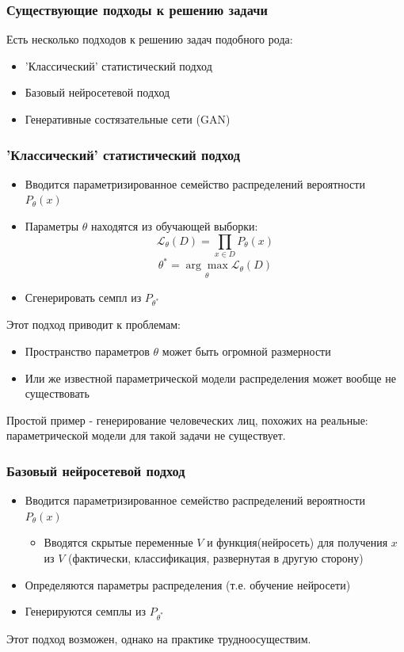 \documentclass[9pt]{beamer}
\begin{document}
\begin{frame}\frametitle{Существующие подходы к решению задачи}
	Есть несколько подходов к решению задач подобного рода:
	\begin{itemize}
		\item 'Классический' статистический подход
		\item Базовый нейросетевой подход
		\item Генеративные состязательные сети (GAN)
	\end{itemize}
\end{frame}

\begin{frame}\frametitle{'Классический' статистический подход}
	\begin{itemize}
		\item Вводится параметризированное семейство распределений вероятности $P_{\theta}(x)$
		\item Параметры $\theta$ находятся из обучающей выборки:
		$$ \mathcal{L}_{\theta}(D) = \prod_{x \in D} P_{\theta}(x) $$
		$$ \theta^{*} = \underset{\theta}{\arg\max} \mathcal{L}_{\theta}(D)$$
		\item Сгенерировать семпл из $ P_{\theta^{*}}$
	\end{itemize}
	Этот подход приводит к проблемам:
	\begin{itemize}
		\item Пространство параметров $\theta$ может быть огромной размерности
		\item Или же известной параметрической модели распределения может вообще не существовать
	\end{itemize}
	Простой пример - генерирование человеческих лиц, похожих на реальные: параметрической модели для такой задачи не существует.
\end{frame}

\begin{frame}\frametitle{Базовый нейросетевой подход}
	\begin{itemize}
		\item Вводится параметризированное семейство распределений вероятности $P_{\theta}(x)$
		\begin{itemize}
			\item Вводятся скрытые переменные $V$ и функция(нейросеть) для получения $x$ из $V$ (фактически, классификация, развернутая в другую сторону)
		\end{itemize}
		\item Определяются параметры распределения (т.е. обучение нейросети)
		\item Генерируются семплы из $ P_{\theta^{*}}$
	\end{itemize}
	Этот подход возможен, однако на практике трудноосуществим.
\end{frame}
\end{document}
